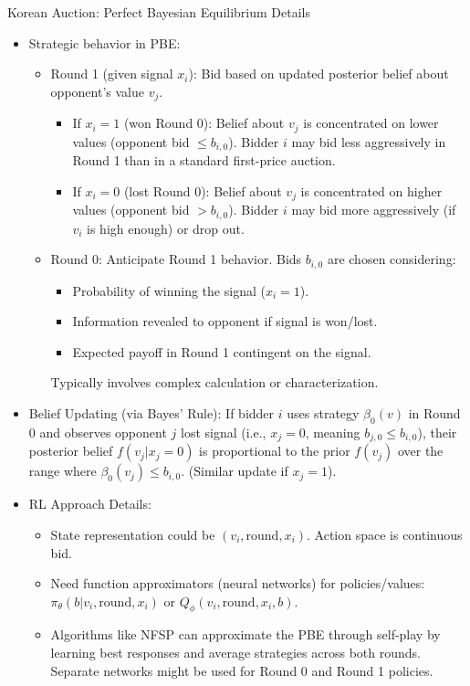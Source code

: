 \documentclass[10pt]{beamer}
\begin{document}
\begin{frame}{Korean Auction: Perfect Bayesian Equilibrium Details}
    \begin{itemize}
        \item Strategic behavior in PBE:
        \begin{itemize}
            \item Round 1 (given signal $x_i$): Bid based on updated posterior belief about opponent's value $v_j$.
                \begin{itemize}
                    \item If $x_i=1$ (won Round 0): Belief about $v_j$ is concentrated on lower values (opponent bid $\leq b_{i,0}$). Bidder $i$ may bid less aggressively in Round 1 than in a standard first-price auction.
                    \item If $x_i=0$ (lost Round 0): Belief about $v_j$ is concentrated on higher values (opponent bid $> b_{i,0}$). Bidder $i$ may bid more aggressively (if $v_i$ is high enough) or drop out.
                \end{itemize}
            \item Round 0: Anticipate Round 1 behavior. Bids $b_{i,0}$ are chosen considering:
                \begin{itemize}
                    \item Probability of winning the signal ($x_i=1$).
                    \item Information revealed to opponent if signal is won/lost.
                    \item Expected payoff in Round 1 contingent on the signal.
                \end{itemize}
             Typically involves complex calculation or characterization.
        \end{itemize}
        \vspace{0.2cm}
        \item Belief Updating (via Bayes' Rule): If bidder $i$ uses strategy $\beta_0(v)$ in Round 0 and observes opponent $j$ lost signal (i.e., $x_j=0$, meaning $b_{j,0} \leq b_{i,0}$), their posterior belief $f(v_j | x_j=0)$ is proportional to the prior $f(v_j)$ over the range where $\beta_0(v_j) \leq b_{i,0}$. (Similar update if $x_j=1$).
        \vspace{0.2cm}
        \item RL Approach Details:
        \begin{itemize}
            \item State representation could be $(v_i, \text{round}, x_i)$. Action space is continuous bid.
            \item Need function approximators (neural networks) for policies/values: $\pi_\theta(b | v_i, \text{round}, x_i)$ or $Q_\phi(v_i, \text{round}, x_i, b)$.
            \item Algorithms like NFSP can approximate the PBE through self-play by learning best responses and average strategies across both rounds. Separate networks might be used for Round 0 and Round 1 policies.
        \end{itemize}
    \end{itemize}
\end{frame}
\end{document}
